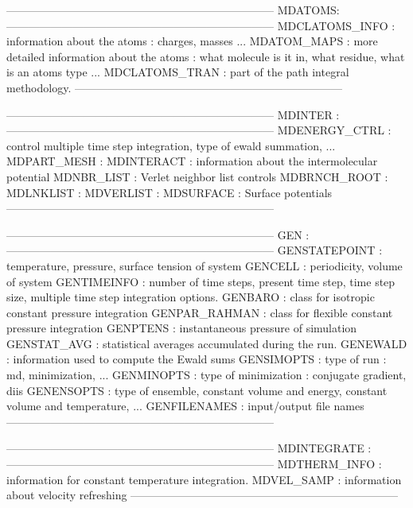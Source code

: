 ------------------------------------------------------------------------
MDATOMS:
------------------------------------------------------------------------
 MDCLATOMS_INFO : information about the atoms : charges, masses ...
 MDATOM_MAPS    : more detailed information about the atoms : 
                  what molecule is it in, what residue, what is
                  an atoms type ...
 MDCLATOMS_TRAN : part of the path integral methodology.
------------------------------------------------------------------------


------------------------------------------------------------------------
MDINTER :
------------------------------------------------------------------------
 MDENERGY_CTRL  : control multiple time step integration,
                   type of ewald summation, ...
 MDPART_MESH    : 
 MDINTERACT     : information about the intermolecular potential
 MDNBR_LIST     : Verlet neighbor list controls
 MDBRNCH_ROOT :
 MDLNKLIST    :
 MDVERLIST    :
 MDSURFACE      : Surface potentials
------------------------------------------------------------------------


------------------------------------------------------------------------
GEN :
------------------------------------------------------------------------
 GENSTATEPOINT  : temperature, pressure, surface tension of system
 GENCELL        : periodicity, volume of system
 GENTIMEINFO    : number of time steps, present time step, time step size,
                   multiple time step integration options.
 GENBARO        : class for isotropic constant pressure integration
 GENPAR_RAHMAN  : class for flexible constant pressure integration
 GENPTENS       : instantaneous pressure of simulation
 GENSTAT_AVG    : statistical averages accumulated during the run.
 GENEWALD       : information used to compute the Ewald sums
 GENSIMOPTS     : type of run : md, minimization, ...
 GENMINOPTS     : type of minimization : conjugate gradient, diis
 GENENSOPTS     : type of ensemble, constant volume and energy,
                   constant volume and temperature, ...
 GENFILENAMES   : input/output file names
------------------------------------------------------------------------


------------------------------------------------------------------------
MDINTEGRATE :
------------------------------------------------------------------------
 MDTHERM_INFO   : information for constant temperature integration.
 MDVEL_SAMP     : information about velocity refreshing
------------------------------------------------------------------------


